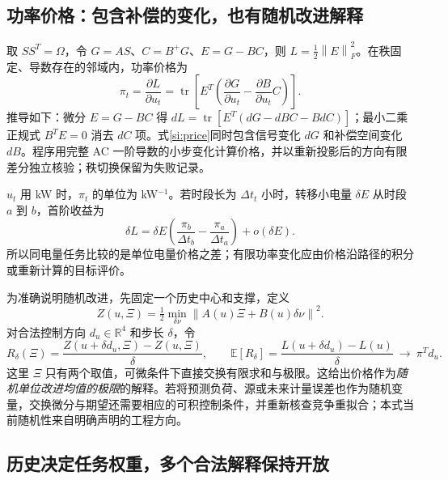 \documentclass[UTF8,fontset=fandol,11pt,a4paper]{ctexart}
\newcommand{\R}{\mathbb R}
\newcommand{\norm}[1]{\left\lVert#1\right\rVert}
\begin{document}
\subsection{功率价格：包含补偿的变化，也有随机改进解释}

取 $SS^T=\Omega$，令 $G=AS$、$C=B^+G$、$E=G-BC$，则 $L=\tfrac12\norm{E}_F^2$。在秩固定、导数存在的邻域内，功率价格为
\begin{equation}
 \boxed{\pi_t=\frac{\partial L}{\partial u_t}
 =\operatorname{tr}\!\left[E^T
 \left(\frac{\partial G}{\partial u_t}
       -\frac{\partial B}{\partial u_t}C\right)\right].}
 \label{si:price}
\end{equation}
推导如下：微分 $E=G-BC$ 得
$dL=\operatorname{tr}[E^T(dG-dBC-BdC)]$；最小二乘正规式 $B^TE=0$ 消去 $dC$ 项。式\eqref{si:price}同时包含信号变化 $dG$ 和补偿空间变化 $dB$。程序用完整 AC 一阶导数的小步变化计算价格，并以重新投影后的方向有限差分独立核验；秩切换保留为失败记录。

$u_t$ 用 kW 时，$\pi_t$ 的单位为 kW$^{-1}$。若时段长为 $\Delta t_t$ 小时，转移小电量 $\delta E$ 从时段 $a$ 到 $b$，首阶收益为
\begin{equation}
 \delta L=\delta E\left(\frac{\pi_b}{\Delta t_b}-\frac{\pi_a}{\Delta t_a}\right)+o(\delta E).
 \label{si:energy-price}
\end{equation}
所以同电量任务比较的是单位电量价格之差；有限功率变化应由价格沿路径的积分或重新计算的目标评价。

为准确说明随机改进，先固定一个历史中心和支撑，定义
\[Z(u,\Xi)=\tfrac12\min_{\delta\nu}\norm{A(u)\Xi+B(u)\delta\nu}^2.\]
对合法控制方向 $d_u\in\R^4$ 和步长 $\delta$，令
\begin{equation}
 R_\delta(\Xi)=\frac{Z(u+\delta d_u,\Xi)-Z(u,\Xi)}{\delta},\qquad
 \mathbb E[R_\delta]=\frac{L(u+\delta d_u)-L(u)}{\delta}
 \ \longrightarrow\ \pi^Td_u.
 \label{si:random-unit}
\end{equation}
这里 $\Xi$ 只有两个取值，可微条件下直接交换有限求和与极限。这给出价格作为\emph{随机单位改进均值的极限}的解释。若将预测负荷、源或未来计量误差也作为随机变量，交换微分与期望还需要相应的可积控制条件，并重新核查竞争重拟合；本式当前随机性来自明确声明的工程方向。

\subsection{历史决定任务权重，多个合法解释保持开放}
\end{document}
